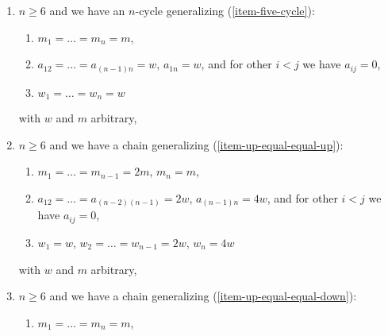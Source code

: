 \begin{lemma}
\begin{enumerate}
$$\right),
\quad
\left(
\begin{matrix}
-2w & 2w & 0 & 0 & 0 \\
2w & -4w & 2w & 0 & 0 \\
0 & 2w & -4w & 2w & 2w \\
0 & 0 & 2w & -4w & 0 \\
0 & 0 & 2w & 0 & -4w \\
\end{matrix}
\right),
\quad
\left(
\begin{matrix}
w \\
2w \\
2w \\
2w \\
2w
\end{matrix}
\right),
\quad
\left(
\begin{matrix}
0 \\
0 \\
0 \\
0 \\
0
\end{matrix}
\right)
$$
with $w$ and $m$ arbitrary,
\item
\label{item-n-cycle}
$n \geq 6$ and we have an $n$-cycle generalizing (\ref{item-five-cycle}):
\begin{enumerate}
\item $m_1 = \ldots = m_n = m$,
\item $a_{12} = \ldots = a_{(n - 1) n} = w$, $a_{1n} = w$,
and for other $i < j$ we have $a_{ij} = 0$,
\item $w_1 = \ldots = w_n = w$
\end{enumerate}
with $w$ and $m$ arbitrary,
\item
\label{item-up-chain-equal-up}
$n \geq 6$ and we have a chain generalizing (\ref{item-up-equal-equal-up}):
\begin{enumerate}
\item $m_1 = \ldots = m_{n - 1} = 2m$, $m_n = m$,
\item $a_{12} = \ldots = a_{(n - 2) (n - 1)} = 2w$, $a_{(n - 1) n} = 4w$,
and for other $i < j$ we have $a_{ij} = 0$,
\item $w_1 = w$, $w_2 = \ldots = w_{n - 1} = 2w$, $w_n = 4w$
\end{enumerate}
with $w$ and $m$ arbitrary,
\item
\label{item-up-chain-equal-down}
$n \geq 6$ and we have a chain generalizing (\ref{item-up-equal-equal-down}):
\begin{enumerate}
\item $m_1 = \ldots = m_n = m$,

\end{enumerate}
\end{enumerate}
\end{lemma}

